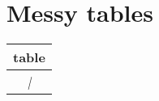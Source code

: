 \section{Messy tables}
\begin{longtable}[]{@{}c@{}}
\hline
table\tabularnewline
\hline
\endfirsthead
\textit{|}\tabularnewline
\hline
\end{longtable}
